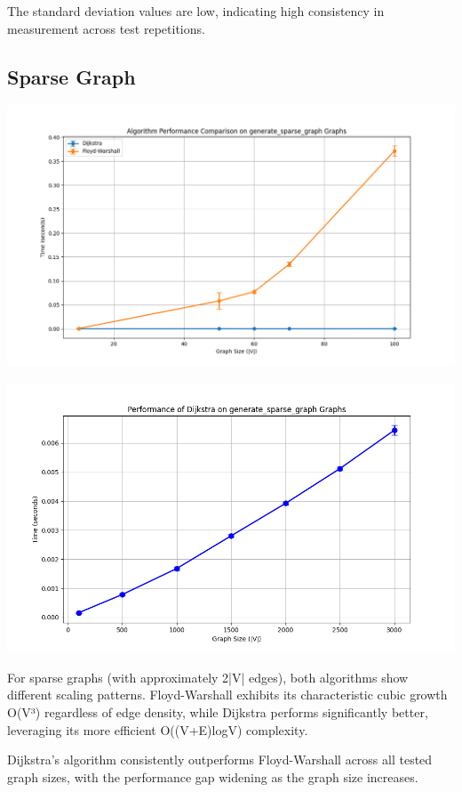 \documentclass[a4paper,12pt]{article}
\begin{document}
The standard deviation values are low, indicating high consistency in measurement across test repetitions.
\subsection{Sparse Graph}
\label{sec:org72faf5f}
\begin{center}
\includegraphics[width=.9\linewidth]{dijkstra_floyd_sparse.png}
\label{org133054c}
\end{center}
\begin{center}
\includegraphics[width=.9\linewidth]{dijkstra_sparse.png}
\label{org35b02ef}
\end{center}

For sparse graphs (with approximately 2|V| edges), both algorithms show different scaling patterns. Floyd-Warshall exhibits its characteristic cubic growth O(V³) regardless of edge density, while Dijkstra performs significantly better, leveraging its more efficient O((V+E)logV) complexity.

Dijkstra's algorithm consistently outperforms Floyd-Warshall across all tested graph sizes, with the performance gap widening as the graph size increases.
\end{document}
